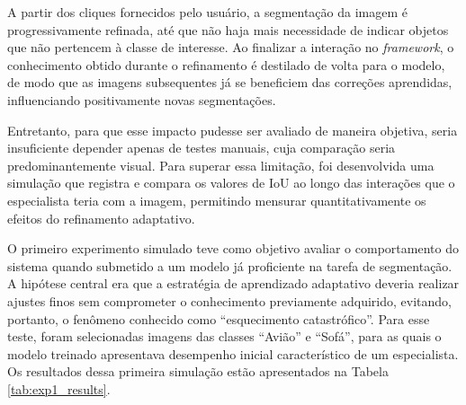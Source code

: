 A partir dos cliques fornecidos pelo usuário, a segmentação da imagem é progressivamente refinada, até que não haja mais necessidade de indicar objetos que não pertencem à classe de interesse. Ao finalizar a interação no \textit{framework}, o conhecimento obtido durante o refinamento é destilado de volta para o modelo, de modo que as imagens subsequentes já se beneficiem das correções aprendidas, influenciando positivamente novas segmentações.


Entretanto, para que esse impacto pudesse ser avaliado de maneira objetiva, seria insuficiente depender apenas de testes manuais, cuja comparação seria predominantemente visual. Para superar essa limitação, foi desenvolvida uma simulação que registra e compara os valores de \ac{IoU} ao longo das interações que o especialista teria com a imagem, permitindo mensurar quantitativamente os efeitos do refinamento adaptativo.


O primeiro experimento simulado teve como objetivo avaliar o comportamento do sistema quando submetido a um modelo já proficiente na tarefa de segmentação. A hipótese central era que a estratégia de aprendizado adaptativo deveria realizar ajustes finos sem comprometer o conhecimento previamente adquirido, evitando, portanto, o fenômeno conhecido como ``esquecimento catastrófico''. Para esse teste, foram selecionadas imagens das classes ``Avião'' e ``Sofá'', para as quais o modelo treinado apresentava desempenho inicial característico de um especialista. Os resultados dessa primeira simulação estão apresentados na Tabela \ref{tab:exp1_results}.



